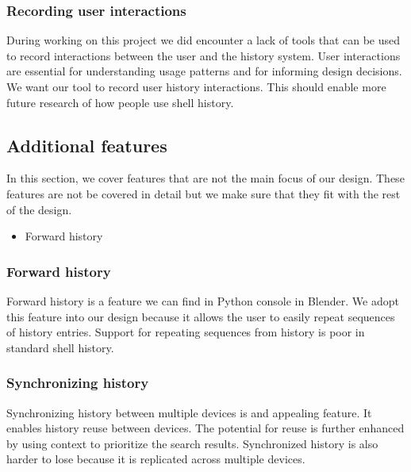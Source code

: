 \documentclass[thesis=M,english]{FITthesis}[2012/10/20]
\begin{document}
\subsubsection{Recording user interactions}
During working on this project we did encounter a lack of tools that can be used to record interactions between the user and the history system.
User interactions are essential for understanding usage patterns and for informing design decisions.
We want our tool to record user history interactions.
This should enable more future research of how people use shell history.

\subsection{Additional features}

In this section, we cover features that are not the main focus of our design. These features are not be covered in detail but we make sure that they fit with the rest of the design. 

\begin{itemize}
    \item Forward history
\end{itemize}

\subsubsection{Forward history}

Forward history is a feature we can find in Python console in Blender. We adopt this feature into our design because it allows the user to easily repeat sequences of history entries. Support for repeating sequences from history is poor in standard shell history.

\subsubsection{Synchronizing history}

Synchronizing history between multiple devices is and appealing feature. It enables history reuse between devices. The potential for reuse is further enhanced by using context to prioritize the search results.
Synchronized history is also harder to lose because it is replicated across multiple devices. 

\end{document}
